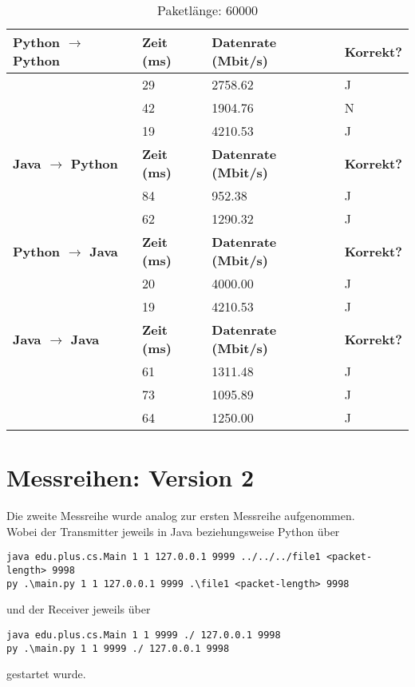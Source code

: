 \documentclass{article}
\begin{document}
    \begin{table}[]
        \caption{Paketlänge: 60000}
        \label{tab:my-tablev1_60000}
        \begin{tabular}{|l|l|l|l|}
            \hline
            \textbf{Python $\rightarrow$ Python} & \textbf{Zeit (ms)} & \textbf{Datenrate (Mbit/s)} & \textbf{Korrekt?} \\ \hline
            & 29        & 2758.62            & J        \\ \cline{2-4}
            & 42        & 1904.76            & N        \\ \cline{2-4}
            & 19        & 4210.53            & J        \\ \hline
            \textbf{Java $\rightarrow$ Python}   & \textbf{Zeit (ms)} & \textbf{Datenrate (Mbit/s)} & \textbf{Korrekt?} \\ \hline
            & 84        & 952.38             & J        \\ \cline{2-4}
            & 62        & 1290.32            & J        \\ \hline
            \textbf{Python $\rightarrow$ Java}   & \textbf{Zeit (ms)} & \textbf{Datenrate (Mbit/s)} & \textbf{Korrekt?} \\ \hline
            & 20        & 4000.00            & J        \\ \cline{2-4}
            & 19        & 4210.53            & J        \\ \hline
            \textbf{Java $\rightarrow$ Java}    & \textbf{Zeit (ms)} & \textbf{Datenrate (Mbit/s)} & \textbf{Korrekt?} \\ \hline
            & 61        & 1311.48            & J        \\ \cline{2-4}
            & 73        & 1095.89            & J        \\ \cline{2-4}
            & 64        & 1250.00            & J        \\ \hline
        \end{tabular}
    \end{table}

    \pagebreak

    \section{Messreihen: Version 2}
    Die zweite Messreihe wurde analog zur ersten Messreihe aufgenommen.\\

    Wobei der Transmitter jeweils in Java beziehungsweise Python über
    \begin{lstlisting}
java edu.plus.cs.Main 1 1 127.0.0.1 9999 ../../../file1 <packet-length> 9998
py .\main.py 1 1 127.0.0.1 9999 .\file1 <packet-length> 9998
    \end{lstlisting}und der Receiver jeweils über
    \begin{lstlisting}
java edu.plus.cs.Main 1 1 9999 ./ 127.0.0.1 9998
py .\main.py 1 1 9999 ./ 127.0.0.1 9998
    \end{lstlisting}
    gestartet wurde.
\end{document}
